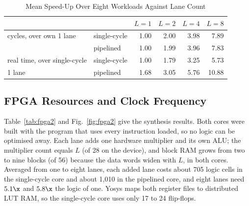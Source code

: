 \begin{table}[t]
\centering
\caption{Mean Speed-Up Over Eight Workloads Against Lane Count}
\label{tab:scale}
\footnotesize
\setlength{\tabcolsep}{3pt}
\begin{tabular}{@{}llrrrr@{}}
\toprule
 & & $L{=}1$ & $L{=}2$ & $L{=}4$ & $L{=}8$ \\
\midrule
cycles, over own 1 lane & single-cycle & 1.00 & 2.00 & 3.98 & 7.89 \\
                        & pipelined    & 1.00 & 1.99 & 3.96 & 7.83 \\
\addlinespace
real time, over single-cycle & single-cycle & 1.00 & 1.79 & 3.25 & 5.73 \\
1 lane                       & pipelined    & 1.68 & 3.05 & 5.76 & 10.88 \\
\bottomrule
\end{tabular}
\end{table}

\subsection{FPGA Resources and Clock Frequency}\label{sec:fpga}
Table~\ref{tab:fpga2} and Fig.~\ref{fig:fpga2} give the synthesis results. Both cores
were built with the program that uses every instruction loaded, so no logic can be
optimised away. Each lane adds one hardware multiplier and its own ALU; the multiplier
count equals $L$ (of 28 on the device), and block RAM grows from two to nine blocks (of
56) because the data words widen with $L$, in both cores. Averaged from one to eight
lanes, each added lane costs about 705 logic cells in the single-cycle core and about
1,010 in the pipelined core, and eight lanes need $5.1\x$ and $5.8\x$ the logic of one.
Yosys maps both register files to distributed LUT RAM, so the single-cycle core uses
only 17 to 24 flip-flops.


